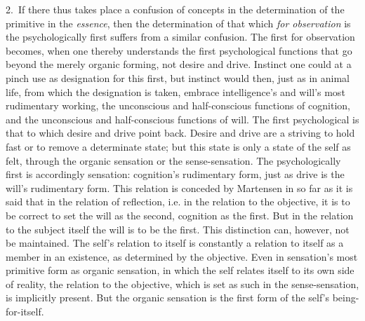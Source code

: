 \documentclass[12pt,a4paper]{book}
\begin{document}
2.~If there thus takes place a confusion of concepts in the determination of the
primitive in the \emph{essence}, then the determination of that which \emph{for
observation} is the psychologically first suffers from a similar confusion. The
first for observation becomes, when one thereby understands the first psychological
functions that go beyond the merely organic forming, not desire and drive. Instinct
one could at a pinch use as designation for this first, but instinct would then,
just as in animal life, from which the designation is taken, embrace intelligence's
and will's most rudimentary working, the unconscious and half-conscious functions
of cognition, and the unconscious and half-conscious functions of will. The first
psychological is that to which desire and drive point back. Desire and drive are a
striving to hold fast or to remove a determinate state; but this state is only a
state of the self as felt, through the organic sensation or the sense-sensation.
The psychologically first is accordingly sensation: cognition's rudimentary form,
just as drive is the will's rudimentary form. This relation is conceded by
Martensen in so far as it is said that in the relation of reflection, i.e. in the
relation to the objective, it is to be correct to set the will as the second,
cognition as the first. But in the relation to the subject itself the will is to be
the first. This distinction can, however, not be maintained. The self's relation to
itself is constantly a relation to itself as a member in an existence, as
determined by the objective. Even in sensation's most primitive form as organic
sensation, in which the self relates itself to its own side of reality, the relation
to the objective, which is set as such in the sense-sensation, is implicitly
present. But the organic sensation is the first form of the self's being-for-itself.
\end{document}
